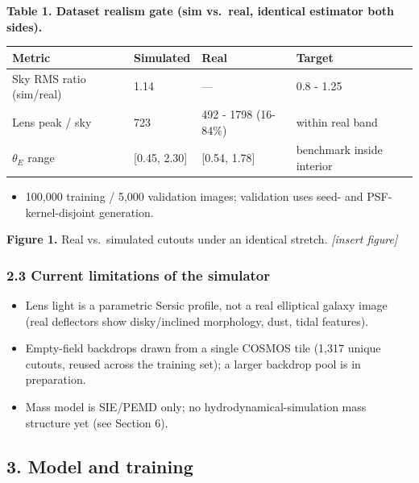 \documentclass[
  11pt,
]{article}
\providecommand{\tightlist}{%
  \setlength{\itemsep}{0pt}\setlength{\parskip}{0pt}}
\begin{document}
\textbf{Table 1. Dataset realism gate (sim vs.~real, identical estimator
both sides).}

\begin{longtable}[]{@{}llll@{}}
\toprule
Metric & Simulated & Real & Target \\
\midrule
\endhead
Sky RMS ratio (sim/real) & 1.14 & --- & 0.8 - 1.25 \\
Lens peak / sky & 723 & 492 - 1798 (16-84\%) & within real band \\
\(\theta_E\) range & {[}0.45, 2.30{]} & {[}0.54, 1.78{]} & benchmark
inside interior \\
\bottomrule
\end{longtable}

\begin{itemize}
\tightlist
\item
  100,000 training / 5,000 validation images; validation uses seed- and
  PSF-kernel-disjoint generation.
\end{itemize}

\textbf{Figure 1.} Real vs.~simulated cutouts under an identical
stretch. \emph{{[}insert figure{]}}

\hypertarget{current-limitations-of-the-simulator}{%
\subsubsection{2.3 Current limitations of the
simulator}\label{current-limitations-of-the-simulator}}

\begin{itemize}
\tightlist
\item
  Lens light is a parametric Sersic profile, not a real elliptical
  galaxy image (real deflectors show disky/inclined morphology, dust,
  tidal features).
\item
  Empty-field backdrops drawn from a single COSMOS tile (1,317 unique
  cutouts, reused across the training set); a larger backdrop pool is in
  preparation.
\item
  Mass model is SIE/PEMD only; no hydrodynamical-simulation mass
  structure yet (see Section 6).
\end{itemize}

\hypertarget{model-and-training}{%
\subsection{3. Model and training}\label{model-and-training}}
\end{document}
